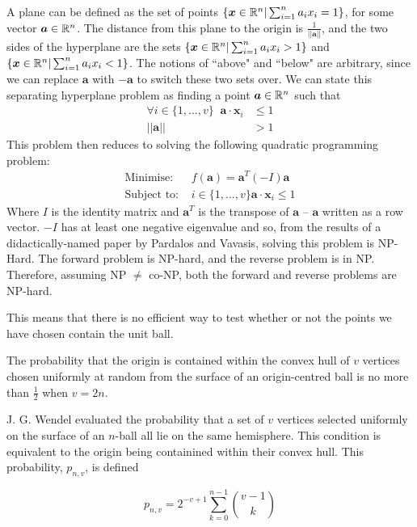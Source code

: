A plane can be defined as the set of points $\{ {\bm x} \in \mathbb{R} ^n | \sum^n_{i=1} a_i x_i = 1\}$, for some vector ${\bm a} \in \mathbb{R} ^n$. The distance from this plane to the origin is $\frac{1}{||{\bm a}||}$, and the two sides of the hyperplane are the sets $\{ {\bm x} \in \mathbb{R} ^n | \sum^n_{i=1} a_i x_i > 1 \}$ and $\{ {\bm x} \in \mathbb{R} ^n | \sum^n_{i=1} a_i x_i < 1 \}$. The notions of ``above" and ``below" are arbitrary, since we can replace $\bm a$ with $-\bm{a}$ to switch these two sets over. We can state this separating hyperplane problem as finding a point ${\bm a} \in \mathbb{R}^n$ such that
\begin{align*}
\forall i \in \{1, ..., v\} \; \; {\bm a} \cdot {\bm x}_i &\leqslant 1 \\
||{\bm a}|| &> 1
\end{align*}
This problem then reduces to solving the following quadratic programming problem:
\begin{align*}
\mbox{Minimise: }& f({\bm a}) = {\bm a}^T (-I) {\bm a} \\
\mbox{Subject to: }& i \in \{1, ..., v\} {\bm a} \cdot {\bm x}_i \leqslant 1 
\end{align*}
Where $I$ is the identity matrix and ${\bm a}^T$ is the transpose of ${\bm a}$ -- ${\bm a}$ written as a row vector. $-I$ has at least one negative eigenvalue and so, from the results of a didactically-named paper by Pardalos and Vavasis\cite{Pardalos91}, solving this problem is NP-Hard. The forward problem is NP-hard, and the reverse problem is in NP. Therefore, assuming NP $\neq$ co-NP, both the forward and reverse problems are NP-hard.

This means that there is no efficient way to test whether or not the points we have chosen contain the unit ball.

\begin{proposition}
The probability that the origin is contained within the convex hull of $v$ vertices chosen uniformly at random from the surface of an origin-centred ball is no more than $\frac{1}{2}$ when $v = 2n$.
\end{proposition}

J. G. Wendel\cite{Wendel62} evaluated the probability that a set of $v$ vertices selected uniformly on the surface of an $n$-ball all lie on the same hemisphere. This condition is equivalent to the origin being containined within their convex hull. This probability, $p_{n,v}$, is defined

$$
p_{n,v} = 2^{-v+1} \sum_{k=0}^{n-1} {{v-1} \choose k}
$$

